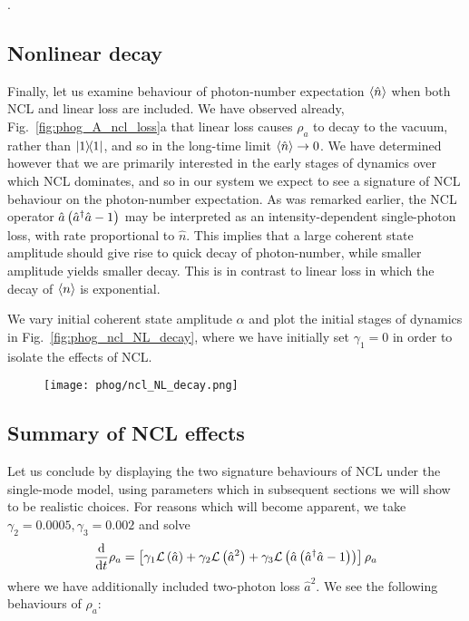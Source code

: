 .

\subsection{Nonlinear decay}

Finally, let us examine behaviour of photon-number expectation $\ev{\hat{n}}$ when both NCL and linear loss are included. We have observed already, Fig.~\ref{fig:phog_A_ncl_loss}a that linear loss causes $\rho_a$ to decay to the vacuum, rather than $\dyad{1}$, and so in the long-time limit $\ev{\hat{n}} \rightarrow 0$. We have determined however that we are primarily interested in the early stages of dynamics over which NCL dominates, and so in our system we expect to see a signature of NCL behaviour on the photon-number expectation. As was remarked earlier, the NCL operator $\hat{a}\left(\hat{a}^\dagger \hat{a} - 1\right)$ may be interpreted as an intensity-dependent single-photon loss, with rate proportional to $\hat{n}$. This implies that a large coherent state amplitude should give rise to quick decay of photon-number, while smaller amplitude yields smaller decay. This is in contrast to linear loss in which the decay of $\ev{n}$ is exponential. 

We vary initial coherent state amplitude $\alpha$ and plot the initial stages of dynamics in Fig.~\ref{fig:phog_ncl_NL_decay}, where we have initially set $\gamma_1=0$ in order to isolate the effects of NCL. 

\begin{figure}[htp]
\centering
\texttt{[image: phog/ncl\_NL\_decay.png]}
\end{figure}


\subsection{Summary of NCL effects}
Let us conclude by displaying the two signature behaviours of NCL under the single-mode model, using parameters which in subsequent sections we will show to be realistic choices. For reasons which will become apparent, we take $\gamma_2 = 0.0005, \gamma_3 = 0.002$ and solve
\begin{equation}\label{eqn:phog_full_single_mode}
\frac{\mathrm{d}}{\mathrm{d}t} \rho_a = \left[\gamma_1 \mathcal{L}\left(\hat{a}\right) + \gamma_2 \mathcal{L}\left(\hat{a}^2\right) + \gamma_3 \mathcal{L}\left(\hat{a}\left(\hat{a}^\dagger \hat{a} - 1\right)\right) \right] \rho_a
\end{equation}
where we have additionally included two-photon loss $\hat{a}^2$. We see the following behaviours of $\rho_a$:

